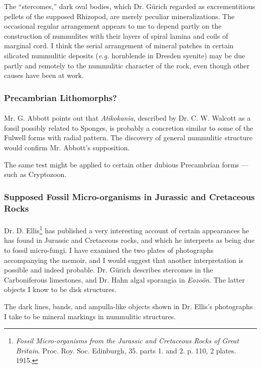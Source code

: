 \documentclass[a4paper, 12pt, oneside]{article}
\begin{document}
The ``stercomes,'' dark oval bodies, which Dr. Gürich regarded as excrementitious pellets of the supposed Rhizopod, are merely peculiar mineralizations. The occasional regular arrangement appears to me to depend partly on the construction of nummulites with their layers of spiral lamina and coils of marginal cord. I think the serial arrangement of mineral patches in certain silicated nummulitic deposits (\emph{e.g.} hornblende in Dresden syenite) may be due partly and remotely to the nummulitic character of the rock, even though other causes have been at work.

\subsubsection{Precambrian Lithomorphs?}
\paragraph{}
Mr. G. Abbott points out that \emph{Atikokania}, described by Dr. C. W. Walcott as a fossil possibly related to Sponges, is probably a concretion similar to some of the Fulwell forms with radial pattern. The discovery of general nummulitic structure would confirm Mr. Abbott's supposition.

The same test might be applied to certain other dubious Precambrian forms --- such as Cryptozoon.

\subsubsection{Supposed Fossil Micro-organisms in Jurassic and Cretaceous Rocks}
\paragraph{}
Dr. D. Ellis\footnote{\emph{Fossil Micro-organisms from the Jurassic and Cretaceous Rocks of Great Britain}. Proc. Roy. Soc. Edinburgh, 35. parts 1. and 2. p. 110, 2 plates. 1915.} has published a very interesting account of certain appearances he has found in Jurassic and Cretaceous rocks, and which he interprets as being due to fossil micro-fungi. I have examined the two plates of photographs accompanying the memoir, and I would suggest that another interpretation is possible and indeed probable. Dr. Gürich describes stercomes in the Carboniferous limestones, and Dr. Hahn algal sporangia in \emph{Eozoön}. The latter objects I know to be disk structures.

The dark lines, bands, and ampulla-like objects shown in Dr. Ellis's photographs I take to be mineral markings in nummulitic structures.
\end{document}
